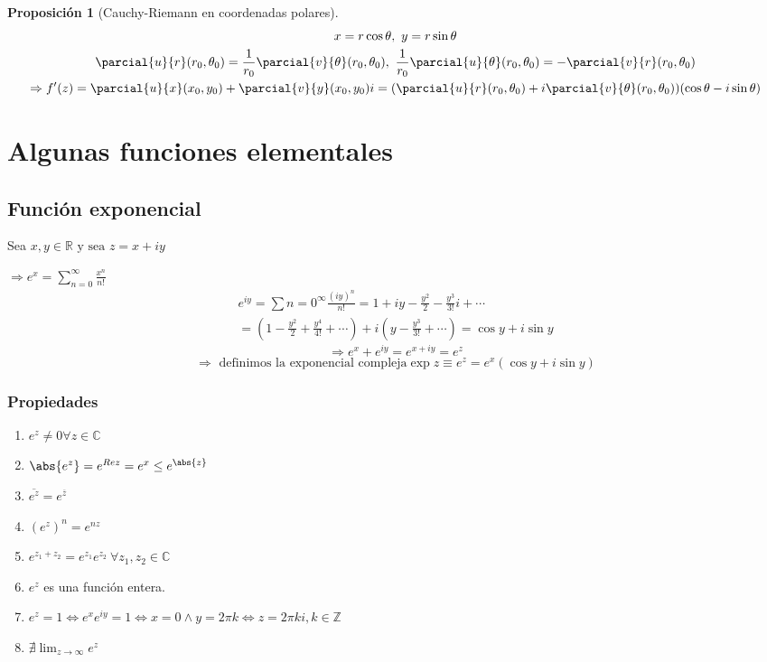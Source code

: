 \documentclass[12pt]{book}
\newtheorem{prop}{Proposición}[chapter]
\newcommand{\R}{\mathbb{R}}
\newcommand{\C}{\mathbb{C}}
\newcommand{\Z}{\mathbb{Z}}
\begin{document}
\begin{prop}[Cauchy-Riemann en coordenadas polares]
\begin{multline*}
x = r\cos\theta,\ y = r\sin\theta\\
\parcial{u}{r}(r_0,\theta_0) = \frac{1}{r_0}\parcial{v}{\theta}(r_0,\theta_0),\ \frac{1}{r_0}\parcial{u}{\theta}(r_0,\theta_0) = -\parcial{v}{r}(r_0,\theta_0)\\
\Rightarrow f'(z) = \parcial{u}{x}(x_0,y_0) + \parcial{v}{y}(x_0,y_0)i = (\parcial{u}{r}(r_0,\theta_0) + i\parcial{v}{\theta}(r_0,\theta_0))(\cos\theta -i\sin\theta)
\end{multline*}
\end{prop}

\section{Algunas funciones elementales}
\subsection{Función exponencial}
Sea $x,y \in\R \text{ y sea } z = x+iy$ 

$\Rightarrow e^{x} = \sum_{n=0}^\infty \frac{x^n}{n!}$
\begin{multline*}
e^{iy} = \sum{n=0}^\infty \frac{(iy)^n}{n!} = 1 + iy - \frac{y^2}{2}-\frac{y^3}{3!}i + \cdots\\
= (1-\frac{y^2}{2} + \frac{y^4}{4!}+\cdots) +i(y-\frac{y^3}{3!}+\cdots) = \cos y + i \sin y
\end{multline*}
$$
\Rightarrow e^x + e^{iy} = e^{x+iy} = e^z$$
$$ \Rightarrow \text{ definimos la exponencial compleja}\exp{z} \equiv e^{z} = e^x(\cos y + i \sin y)$$
\subsubsection*{Propiedades}
\begin{enumerate}
\item $e^z \neq 0 \forall z \in \C$
\item $\abs{e^{z}} = e^{Re z} = e^x\leq e^{\abs{z}}$
\item $\overline{e^z} = e^{\overline z}$
\item $(e^z)^n = e^{nz}$
\item $e^{z_1+z_2} = e^{z_1}e^{z_2}\ \forall z_1,z_2 \in\C$
\item $e^z$ es una función entera.
\item $ e^z = 1 \Leftrightarrow e^x e^{iy}=1 \Leftrightarrow x = 0 \wedge y = 2\pi k \Leftrightarrow z = 2\pi ki, k\in \Z$
\item $\displaystyle \nexists \lim_{z \to \infty} e^z$
\end{enumerate}
\end{document}
